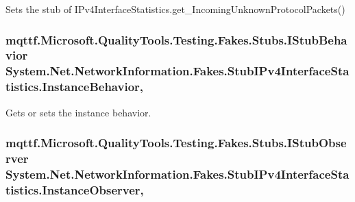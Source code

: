 Sets the stub of I\-Pv4\-Interface\-Statistics.\-get\-\_\-\-Incoming\-Unknown\-Protocol\-Packets()

\hypertarget{class_system_1_1_net_1_1_network_information_1_1_fakes_1_1_stub_i_pv4_interface_statistics_ac8604d1ec23f98b6e3fc1a4b15601f11}{
\subsubsection[{Instance\-Behavior}]{\setlength{\rightskip}{0pt plus 5cm}mqttf.\-Microsoft.\-Quality\-Tools.\-Testing.\-Fakes.\-Stubs.\-I\-Stub\-Behavior System.\-Net.\-Network\-Information.\-Fakes.\-Stub\-I\-Pv4\-Interface\-Statistics.\-Instance\-Behavior\hspace{0.3cm}{\ttfamily [get]}, {\ttfamily [set]}}}\label{class_system_1_1_net_1_1_network_information_1_1_fakes_1_1_stub_i_pv4_interface_statistics_ac8604d1ec23f98b6e3fc1a4b15601f11}


Gets or sets the instance behavior.

\hypertarget{class_system_1_1_net_1_1_network_information_1_1_fakes_1_1_stub_i_pv4_interface_statistics_a66b8f62a482fe9059d0309545c5742c1}{
\subsubsection[{Instance\-Observer}]{\setlength{\rightskip}{0pt plus 5cm}mqttf.\-Microsoft.\-Quality\-Tools.\-Testing.\-Fakes.\-Stubs.\-I\-Stub\-Observer System.\-Net.\-Network\-Information.\-Fakes.\-Stub\-I\-Pv4\-Interface\-Statistics.\-Instance\-Observer\hspace{0.3cm}{\ttfamily [get]}, {\ttfamily [set]}}}\label{class_system_1_1_net_1_1_network_information_1_1_fakes_1_1_stub_i_pv4_interface_statistics_a66b8f62a482fe9059d0309545c5742c1}


